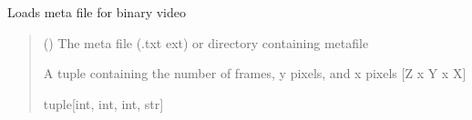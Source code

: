 \documentclass[letterpaper,10pt,english]{sphinxmanual}
\begin{document}
\begin{fulllineitems}
\label{\detokenize{CalSciPy.io:CalSciPy.io.load_binary_meta}}
\pysigstartsignatures
{}
\pysigstopsignatures
\sphinxAtStartPar
Loads meta file for binary video
\begin{quote}\begin{description}
\sphinxAtStartPar
{} (\sphinxstyleliteralemphasis{\sphinxupquote{{[}}}\sphinxstyleliteralemphasis{\sphinxupquote{, }}\sphinxstyleliteralemphasis{\sphinxupquote{{]}}}) \sphinxhyphen{}\sphinxhyphen{} The meta file (.txt ext) or directory containing metafile

\sphinxAtStartPar
A tuple containing the number of frames, y pixels, and x pixels {[}Z x Y x X{]}

\sphinxAtStartPar
tuple{[}int, int, int, str{]}

\end{description}\end{quote}

\end{fulllineitems}

\end{document}
